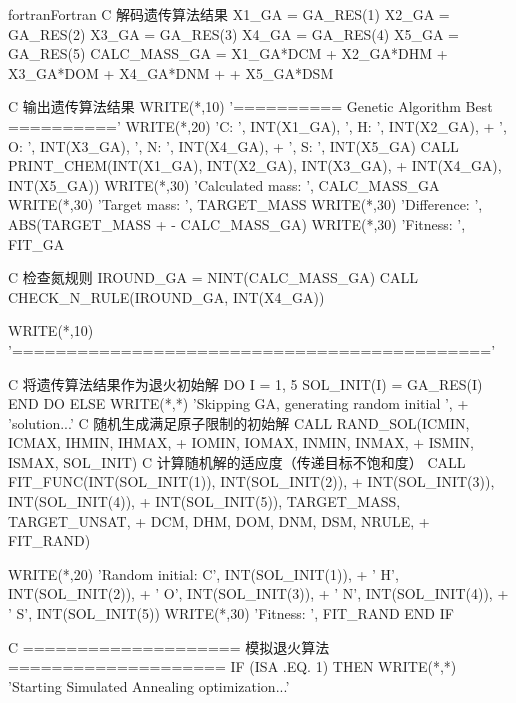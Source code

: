 \begin{envcode}{fortran}{Fortran}
C         解码遗传算法结果
          X1_GA = GA_RES(1)
          X2_GA = GA_RES(2)
          X3_GA = GA_RES(3)
          X4_GA = GA_RES(4)
          X5_GA = GA_RES(5)
          CALC_MASS_GA = X1_GA*DCM + X2_GA*DHM + X3_GA*DOM + X4_GA*DNM
     +                 + X5_GA*DSM
          
C         输出遗传算法结果
          WRITE(*,10) '========== Genetic Algorithm Best =========='
          WRITE(*,20) 'C: ', INT(X1_GA), ', H: ', INT(X2_GA),
     +                ', O: ', INT(X3_GA), ', N: ', INT(X4_GA),
     +                ', S: ', INT(X5_GA)
          CALL PRINT_CHEM(INT(X1_GA), INT(X2_GA), INT(X3_GA),
     +                    INT(X4_GA), INT(X5_GA))
          WRITE(*,30) 'Calculated mass: ', CALC_MASS_GA
          WRITE(*,30) 'Target mass:     ', TARGET_MASS
          WRITE(*,30) 'Difference:      ', ABS(TARGET_MASS 
     +                - CALC_MASS_GA)
          WRITE(*,30) 'Fitness:         ', FIT_GA
          
C         检查氮规则
          IROUND_GA = NINT(CALC_MASS_GA)
          CALL CHECK_N_RULE(IROUND_GA, INT(X4_GA))
          
          WRITE(*,10) '============================================'

C         将遗传算法结果作为退火初始解
          DO I = 1, 5
              SOL_INIT(I) = GA_RES(I)
          END DO
      ELSE
          WRITE(*,*) 'Skipping GA, generating random initial ',
     +               'solution...'
C         随机生成满足原子限制的初始解
          CALL RAND_SOL(ICMIN, ICMAX, IHMIN, IHMAX,
     +                  IOMIN, IOMAX, INMIN, INMAX,
     +                  ISMIN, ISMAX, SOL_INIT)
C         计算随机解的适应度（传递目标不饱和度）
          CALL FIT_FUNC(INT(SOL_INIT(1)), INT(SOL_INIT(2)),
     +                  INT(SOL_INIT(3)), INT(SOL_INIT(4)),
     +                  INT(SOL_INIT(5)), TARGET_MASS, TARGET_UNSAT,
     +                  DCM, DHM, DOM, DNM, DSM, NRULE,
     +                  FIT_RAND)
          
          WRITE(*,20) 'Random initial: C', INT(SOL_INIT(1)),
     +                ' H', INT(SOL_INIT(2)),
     +                ' O', INT(SOL_INIT(3)),
     +                ' N', INT(SOL_INIT(4)),
     +                ' S', INT(SOL_INIT(5))
          WRITE(*,30) 'Fitness: ', FIT_RAND
      END IF
      
C     ==================== 模拟退火算法 ====================
      IF (ISA .EQ. 1) THEN
          WRITE(*,*) 'Starting Simulated Annealing optimization...'
          

\end{envcode}
